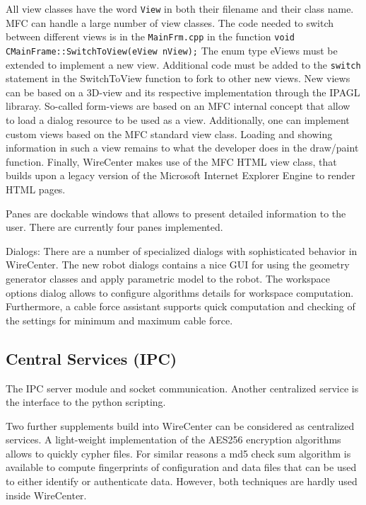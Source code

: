 \documentclass[11pt,a4paper,onepage,openany]{book}
\begin{document}
All view classes have the word \texttt{View} in both their filename and their
class name. MFC can handle a large number of view classes. The code needed to
switch between different views is in the \texttt{MainFrm.cpp} in the function
\texttt{void CMainFrame::SwitchToView(eView nView);} The enum type eViews must
be extended to implement a new view. Additional code must be added to the
\texttt{switch} statement in the SwitchToView function to fork to other new
views. New views can be based on a 3D-view and its respective implementation
through the IPAGL libraray. So-called form-views are based on an MFC internal
concept that allow to load a dialog resource to be used as a view.
Additionally, one can implement custom views based on the MFC standard view
class. Loading and showing information in such a view remains to what the
developer does in the draw/paint function. Finally, WireCenter makes use of the
MFC HTML view class, that builds upon a legacy version of the Microsoft
Internet Explorer Engine to render HTML pages.

Panes are dockable windows that allows to present detailed information to the
user. There are currently four panes implemented.

Dialogs: There are a number of specialized dialogs with sophisticated behavior
in WireCenter. The new robot dialogs contains a nice GUI for using the geometry
generator classes and apply parametric model to the robot. The workspace
options dialog allows to configure algorithms details for workspace
computation. Furthermore, a cable force assistant supports quick computation
and checking of the settings for minimum and maximum cable force.

\subsection{Central Services (IPC)}
The IPC server module and socket communication. Another centralized service is
the interface to the python scripting.

Two further supplements build into WireCenter can be considered as centralized
services. A light-weight implementation of the AES256 encryption algorithms
allows to quickly cypher files. For similar reasons a md5 check sum algorithm
is available to compute fingerprints of configuration and data files that can
be used to either identify or authenticate data. However, both techniques are
hardly used inside WireCenter.
\end{document}
